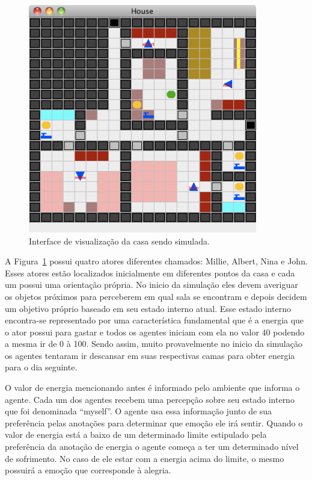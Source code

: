 \begin{figure}
	\begin{center}
		\includegraphics[width=10cm]{figuras/sims.png}
	\end{center}
	\caption{Interface de visualização da casa sendo simulada.}
	\label{fig:sims}
\end{figure}

A Figura~\ref{fig:sims} possui quatro atores diferentes chamados: Millie,
Albert, Nina e John. Esses atores estão localizados inicialmente em diferentes
pontos da casa e cada um possui uma orientação própria. No inicio da simulação eles
devem averiguar os objetos próximos para perceberem em qual sala se encontram
e depois decidem um objetivo próprio baseado em seu estado interno atual.
Esse estado interno encontra-se representado por uma característica
fundamental que é a energia que o ator possui para gastar e todos os agentes
iniciam com ela no valor 40 podendo a mesma ir de 0 à 100. Sendo
assim, muito provavelmente no inicio da simulação os agentes tentaram ir
descansar em suas respectivas camas para obter energia para o dia seguinte.

O valor de energia mencionando antes é informado pelo ambiente que informa o
agente. Cada um dos agentes recebem uma percepção sobre seu estado
interno que foi denominada ``myself''. O agente usa essa informação junto de
sua preferência pelas anotações para determinar que emoção ele irá sentir.
Quando o valor de energia está a baixo de um determinado limite estipulado pela
preferência da anotação de energia o agente começa a ter um
determinado nível de sofrimento. No caso de ele estar com a energia acima do
limite, o mesmo possuirá a emoção que corresponde à alegria.

